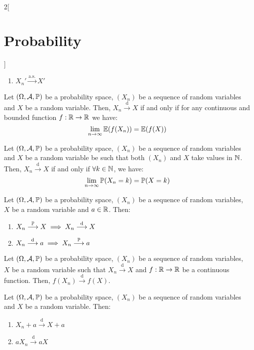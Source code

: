 \documentclass[../../../main_math.tex]{subfiles}
\begin{document}
\begin{multicols}{2}[\section{Probability}]
\begin{theorem}
\begin{enumerate}
      \item ${X_n'}\overset{\text{a.s.}}{\longrightarrow}X'$
    \end{enumerate}
  \end{theorem}
  \begin{theorem}
    Let $(\Omega,\mathcal{A},\mathbb{P})$ be a probability space, $(X_n)$ be a sequence of random variables and $X$ be a random variable. Then, $X_n\overset{\text{d}}{\longrightarrow} X$ if and only if for any continuous and bounded function $f:\mathbb{R}\rightarrow\mathbb{R}$ we have: $$\lim_{n\to\infty}\mathbb{E}(f(X_n))=\mathbb{E}(f(X))$$
  \end{theorem}
  \begin{lemma}
    Let $(\Omega,\mathcal{A},\mathbb{P})$ be a probability space, $(X_n)$ be a sequence of random variables and $X$ be a random variable be such that both $(X_n)$ and $X$ take values in $\mathbb{N}$. Then, $X_n\overset{\text{d}}{\longrightarrow} X$ if and only if $\forall k\in\mathbb{N}$, we have: $$\lim_{n\to\infty} \mathbb{P}(X_n=k)=\mathbb{P}(X=k)$$
  \end{lemma}
  \begin{proposition}
    Let $(\Omega,\mathcal{A},\mathbb{P})$ be a probability space, $(X_n)$ be a sequence of random variables, $X$ be a random variable and $a\in\mathbb{R}$. Then:
    \begin{enumerate}
      \item $X_n\overset{\mathbb{P}}{\longrightarrow} X\implies X_n\overset{\text{d}}{\longrightarrow} X$
      \item $X_n\overset{\text{d}}{\longrightarrow} a\implies X_n\overset{\mathbb{P}}{\longrightarrow} a$
    \end{enumerate}
  \end{proposition}
  \begin{proposition}
    Let $(\Omega,\mathcal{A},\mathbb{P})$ be a probability space, $(X_n)$ be a sequence of random variables, $X$ be a random variable such that $X_n\overset{\text{d}}{\longrightarrow} X$ and $f:\mathbb{R}\rightarrow\mathbb{R}$ be a continuous function. Then, $f(X_n)\overset{\text{d}}{\longrightarrow}f(X)$.
  \end{proposition}
  \begin{corollary}
    Let $(\Omega,\mathcal{A},\mathbb{P})$ be a probability space, $(X_n)$ be a sequence of random variables and $X$ be a random variable. Then:
    \begin{enumerate}
      \item $X_n+a\overset{\text{d}}{\longrightarrow}X+a$
      \item $aX_n\overset{\text{d}}{\longrightarrow}aX$

\end{enumerate}
\end{corollary}
\end{multicols}
\end{document}
